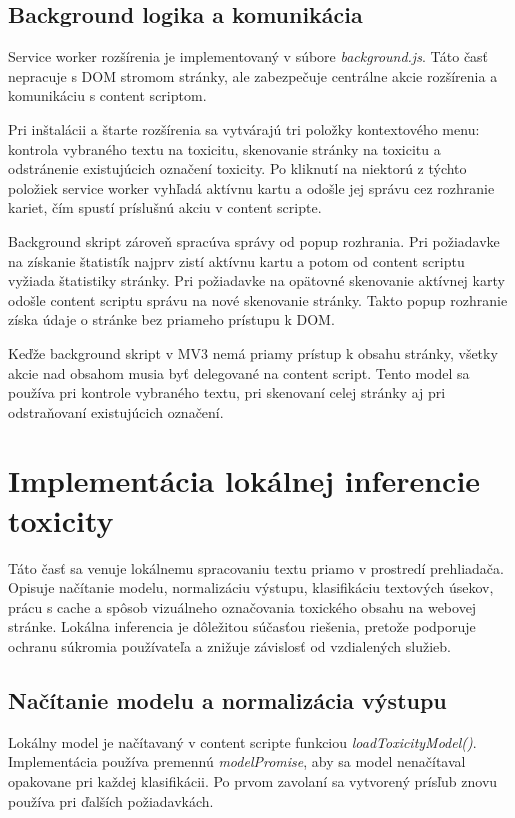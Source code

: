 \subsection{Background logika a komunikácia}
Service worker rozšírenia je implementovaný v súbore \emph{background.js}. Táto časť nepracuje s DOM stromom stránky, ale zabezpečuje centrálne akcie rozšírenia a komunikáciu s content scriptom.

Pri inštalácii a štarte rozšírenia sa vytvárajú tri položky kontextového menu: kontrola vybraného textu na toxicitu, skenovanie stránky na toxicitu a odstránenie existujúcich označení toxicity. Po kliknutí na niektorú z týchto položiek service worker vyhľadá aktívnu kartu a odošle jej správu cez rozhranie kariet, čím spustí príslušnú akciu v content scripte.

Background skript zároveň spracúva správy od popup rozhrania. Pri požiadavke na získanie štatistík najprv zistí aktívnu kartu a potom od content scriptu vyžiada štatistiky stránky. Pri požiadavke na opätovné skenovanie aktívnej karty odošle content scriptu správu na nové skenovanie stránky. Takto popup rozhranie získa údaje o stránke bez priameho prístupu k DOM.

Keďže background skript v MV3 nemá priamy prístup k obsahu stránky, všetky akcie nad obsahom musia byť delegované na content script. Tento model sa používa pri kontrole vybraného textu, pri skenovaní celej stránky aj pri odstraňovaní existujúcich označení.

\section{Implementácia lokálnej inferencie toxicity}

Táto časť sa venuje lokálnemu spracovaniu textu priamo v prostredí prehliadača. Opisuje načítanie modelu, normalizáciu výstupu, klasifikáciu textových úsekov, prácu s cache a spôsob vizuálneho označovania toxického obsahu na webovej stránke. Lokálna inferencia je dôležitou súčasťou riešenia, pretože podporuje ochranu súkromia používateľa a znižuje závislosť od vzdialených služieb.

\subsection{Načítanie modelu a normalizácia výstupu}
Lokálny model je načítavaný v content scripte funkciou \emph{loadToxicityModel()}. Implementácia používa premennú \emph{modelPromise}, aby sa model nenačítaval opakovane pri každej klasifikácii. Po prvom zavolaní sa vytvorený prísľub znovu používa pri ďalších požiadavkách.

